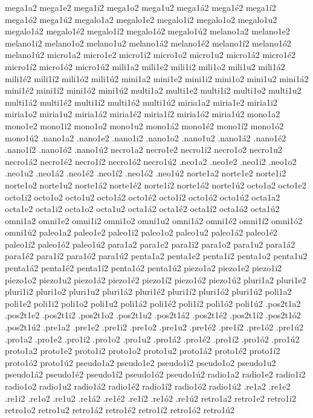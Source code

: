 {mega1a2 mega1e2 mega1i2 mega1o2 mega1u2 mega1á2 mega1é2 mega1í2 mega1ó2 mega1ú2
megalo1a2 megalo1e2 megalo1i2 megalo1o2 megalo1u2 megalo1á2 megalo1é2 megalo1í2 megalo1ó2 megalo1ú2
melano1a2 melano1e2 melano1i2 melano1o2 melano1u2 melano1á2 melano1é2 melano1í2 melano1ó2 melano1ú2
micro1a2 micro1e2 micro1i2 micro1o2 micro1u2 micro1á2 micro1é2 micro1í2 micro1ó2 micro1ú2
mili1a2 mili1e2 mili1i2 mili1o2 mili1u2 mili1á2 mili1é2 mili1í2 mili1ó2 mili1ú2
mini1a2 mini1e2 mini1i2 mini1o2 mini1u2 mini1á2 mini1é2 mini1í2 mini1ó2 mini1ú2
multi1a2 multi1e2 multi1i2 multi1o2 multi1u2 multi1á2 multi1é2 multi1í2 multi1ó2 multi1ú2
miria1a2 miria1e2 miria1i2 miria1o2 miria1u2 miria1á2 miria1é2 miria1í2 miria1ó2 miria1ú2
mono1a2 mono1e2 mono1i2 mono1o2 mono1u2 mono1á2 mono1é2 mono1í2 mono1ó2 mono1ú2
.nano1a2 .nano1e2 .nano1i2 .nano1o2 .nano1u2 .nano1á2 .nano1é2 .nano1í2 .nano1ó2 .nano1ú2
necro1a2 necro1e2 necro1i2 necro1o2 necro1u2 necro1á2 necro1é2 necro1í2 necro1ó2 necro1ú2
.neo1a2 .neo1e2 .neo1i2 .neo1o2 .neo1u2 .neo1á2 .neo1é2 .neo1í2 .neo1ó2 .neo1ú2
norte1a2 norte1e2 norte1i2 norte1o2 norte1u2 norte1á2 norte1é2 norte1í2 norte1ó2 norte1ú2
octo1a2 octo1e2 octo1i2 octo1o2 octo1u2 octo1á2 octo1é2 octo1í2 octo1ó2 octo1ú2
octa1a2 octa1e2 octa1i2 octa1o2 octa1u2 octa1á2 octa1é2 octa1í2 octa1ó2 octa1ú2
omni1a2 omni1e2 omni1i2 omni1o2 omni1u2 omni1á2 omni1é2 omni1í2 omni1ó2 omni1ú2
paleo1a2 paleo1e2 paleo1i2 paleo1o2 paleo1u2 paleo1á2 paleo1é2 paleo1í2 paleo1ó2 paleo1ú2
para1a2 para1e2 para1i2 para1o2 para1u2 para1á2 para1é2 para1í2 para1ó2 para1ú2
penta1a2 penta1e2 penta1i2 penta1o2 penta1u2 penta1á2 penta1é2 penta1í2 penta1ó2 penta1ú2
piezo1a2 piezo1e2 piezo1i2 piezo1o2 piezo1u2 piezo1á2 piezo1é2 piezo1í2 piezo1ó2 piezo1ú2
pluri1a2 pluri1e2 pluri1i2 pluri1o2 pluri1u2 pluri1á2 pluri1é2 pluri1í2 pluri1ó2 pluri1ú2
poli1a2 poli1e2 poli1i2 poli1o2 poli1u2 poli1á2 poli1é2 poli1í2 poli1ó2 poli1ú2
.pos2t1a2 .pos2t1e2 .pos2t1i2 .pos2t1o2 .pos2t1u2 .pos2t1á2 .pos2t1é2 .pos2t1í2 .pos2t1ó2 .pos2t1ú2
.pre1a2 .pre1e2 .pre1i2 .pre1o2 .pre1u2          .pre1é2 .pre1í2 .pre1ó2 .pre1ú2
.pro1a2 .pro1e2 .pro1i2 .pro1o2 .pro1u2 .pro1á2 .pro1é2 .pro1í2 .pro1ó2 .pro1ú2
proto1a2 proto1e2 proto1i2 proto1o2 proto1u2 proto1á2 proto1é2 proto1í2 proto1ó2 proto1ú2
pseudo1a2 pseudo1e2 pseudo1i2 pseudo1o2 pseudo1u2 pseudo1á2 pseudo1é2 pseudo1í2 pseudo1ó2 pseudo1ú2
radio1a2 radio1e2 radio1i2 radio1o2 radio1u2 radio1á2 radio1é2 radio1í2 radio1ó2 radio1ú2
.re1a2 .re1e2 .re1i2 .re1o2 .re1u2 .re1á2 .re1é2 .re1í2 .re1ó2 .re1ú2
retro1a2 retro1e2 retro1i2 retro1o2 retro1u2 retro1á2 retro1é2 retro1í2 retro1ó2 retro1ú2
}
